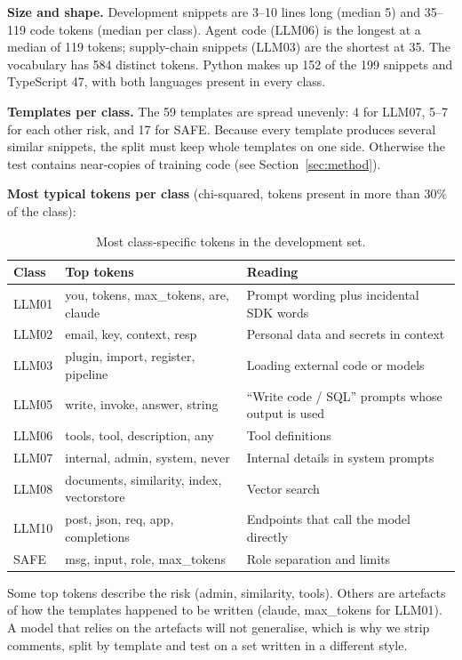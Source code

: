 \documentclass[11pt,a4paper]{article}
\begin{document}
\textbf{Size and shape.} Development snippets are 3--10 lines long (median 5) and 35--119
code tokens (median per class). Agent code (LLM06) is the longest at a median of 119
tokens; supply-chain snippets (LLM03) are the shortest at 35. The vocabulary has 584
distinct tokens. Python makes up 152 of the 199 snippets and TypeScript 47, with both
languages present in every class.

\textbf{Templates per class.} The 59 templates are spread unevenly: 4 for LLM07, 5--7 for
each other risk, and 17 for SAFE. Because every template produces several similar
snippets, the split must keep whole templates on one side. Otherwise the test contains
near-copies of training code (see Section~\ref{sec:method}).

\textbf{Most typical tokens per class} (chi-squared, tokens present in more than 30\% of
the class):

\begin{table}[H]
\centering\small
\begin{tabularx}{\linewidth}{l >{\raggedright\arraybackslash}p{5.6cm} >{\raggedright\arraybackslash}X}
\toprule
Class & Top tokens & Reading \\
\midrule
LLM01 & you, tokens, max\_tokens, are, claude & Prompt wording plus incidental SDK words \\
LLM02 & email, key, context, resp & Personal data and secrets in context \\
LLM03 & plugin, import, register, pipeline & Loading external code or models \\
LLM05 & write, invoke, answer, string & ``Write code / SQL'' prompts whose output is used \\
LLM06 & tools, tool, description, any & Tool definitions \\
LLM07 & internal, admin, system, never & Internal details in system prompts \\
LLM08 & documents, similarity, index, vectorstore & Vector search \\
LLM10 & post, json, req, app, completions & Endpoints that call the model directly \\
SAFE  & msg, input, role, max\_tokens & Role separation and limits \\
\bottomrule
\end{tabularx}
\caption{Most class-specific tokens in the development set.}
\end{table}

Some top tokens describe the risk (admin, similarity, tools). Others are artefacts of how
the templates happened to be written (claude, max\_tokens for LLM01). A model that relies
on the artefacts will not generalise, which is why we strip comments, split by template
and test on a set written in a different style.
\end{document}
